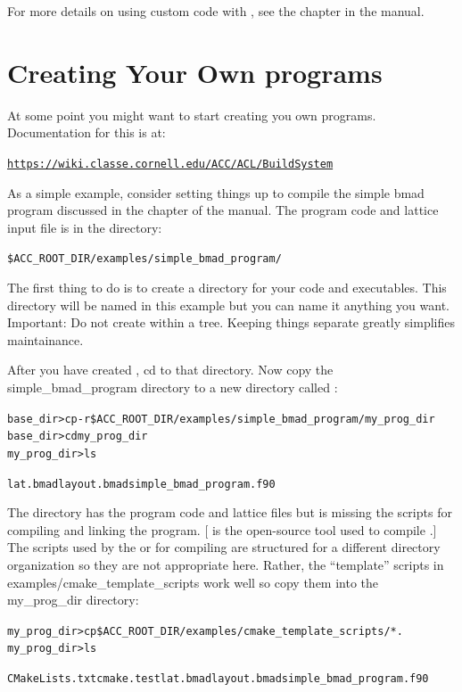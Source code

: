 \documentclass{hitec}
\newcommand{\Section}[1]{\section{#1}\vspace*{-1ex}}
\newenvironment{display}
  {\vspace*{-1.5ex} \begin{alltt}}
  {\end{alltt} \vspace*{-1.0ex}}
\begin{document}
For more details on using custom code with \tao, see the  chapter
in the \tao manual.

\Section{Creating Your Own programs}

At some point you might want to start creating you own programs. Documentation for this is
at:
\begin{display}
  \url{https://wiki.classe.cornell.edu/ACC/ACL/BuildSystem}
\end{display}

As a simple example, consider setting things up to compile the simple bmad program
discussed in the  chapter of the \bmad manual.
The program code and lattice input file is in the directory:
\begin{display}
  \$ACC_ROOT_DIR/examples/simple_bmad_program/
\end{display}

The first thing to do is to create a  directory for your code and executables. This
directory will be named  in this example but you can name it anything you
want. Important: Do not create  within a  tree. Keeping things
separate greatly simplifies maintainance.

After you have created , cd to that directory. Now copy the
simple_bmad_program directory to a new directory called :
\begin{display}
  base_dir> cp -r \$ACC_ROOT_DIR/examples/simple_bmad_program/ my_prog_dir
  base_dir> cd my_prog_dir
  my_prog_dir> ls

  lat.bmad   layout.bmad   simple_bmad_program.f90
\end{display}

The  directory has the program code and lattice files but is
missing the  scripts for compiling and linking the program.  [ is the
open-source tool used to compile \bmad.] The scripts used by the  or
 for compiling are structured for a different directory organization so they
are not appropriate here. Rather, the ``template'' scripts in
examples/cmake_template_scripts work well so copy them into the my_prog_dir
directory:
\begin{display}
  my_prog_dir> cp \$ACC_ROOT_DIR/examples/cmake_template_scripts/* .
  my_prog_dir> ls

  CMakeLists.txt  cmake.test  lat.bmad  layout.bmad simple_bmad_program.f90
\end{display}
\end{document}
